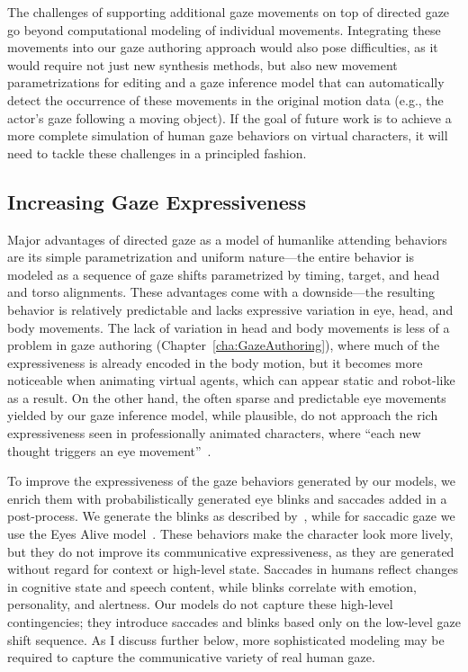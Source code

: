 The challenges of supporting additional gaze movements on top of directed gaze go beyond computational modeling of individual movements. Integrating these movements into our gaze authoring approach would also pose difficulties, as it would require not just new synthesis methods, but also new movement parametrizations for editing and a gaze inference model that can automatically detect the occurrence of these movements in the original motion data (e.g., the actor's gaze following a moving object). If the goal of future work is to achieve a more complete simulation of human gaze behaviors on virtual characters, it will need to tackle these challenges in a principled fashion.

\subsection{Increasing Gaze Expressiveness}

Major advantages of directed gaze as a model of humanlike attending behaviors are its simple parametrization and uniform nature---the entire behavior is modeled as a sequence of gaze shifts parametrized by timing, target, and head and torso alignments. These advantages come with a downside---the resulting behavior is relatively predictable and lacks expressive variation in eye, head, and body movements. The lack of variation in head and body movements is less of a problem in gaze authoring (Chapter~\ref{cha:GazeAuthoring}), where much of the expressiveness is already encoded in the body motion, but it becomes more noticeable when animating virtual agents, which can appear static and robot-like as a result.
On the other hand, the often sparse and predictable eye movements yielded by our gaze inference model, while plausible, do not approach the rich expressiveness seen in professionally animated characters, where ``each new thought triggers an eye movement''~\citep{maestri2001digital}.

To improve the expressiveness of the gaze behaviors generated by our models, we enrich them with probabilistically generated eye blinks and saccades added in a post-process. We generate the blinks as described by~\citet{peters2010animating}, while for saccadic gaze we use the Eyes Alive model~\citep{lee2002eyes}. These behaviors make the character look more lively, but they do not improve its communicative expressiveness, as they are generated without regard for context or high-level state. Saccades in humans reflect changes in cognitive state and speech content, while blinks correlate with emotion, personality, and alertness. Our models do not capture these high-level contingencies; they introduce saccades and blinks based only on the low-level gaze shift sequence. As I discuss further below, more sophisticated modeling may be required to capture the communicative variety of real human gaze.

